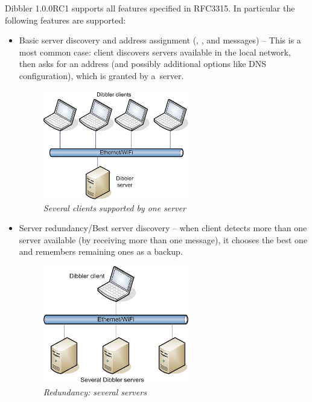 Dibbler 1.0.0RC1 supports all features specified in RFC3315. In
particular the following features are supported:
\begin{itemize}
\item Basic server discovery and address assignment (,
      ,  and  messages) -- This
      is a most common case: client discovers servers available in the
      local network, then asks for an address (and possibly additional
      options like DNS configuration), which is granted by a~server.

\begin{figure}[ht]
\begin{center}
\includegraphics[width=0.6\textwidth]{dibbler-multiple-cli}
\caption{\emph{Several clients supported by one server}}
\end{center}
\end{figure}

\item Server redundancy/Best server discovery -- when client detects
      more than one server available (by receiving more than one
       message), it chooses the best one and remembers
      remaining ones as a backup.

\begin{figure}[ht]
\begin{center}
\includegraphics[width=0.6\textwidth]{dibbler-multiple-srv}
\caption{\emph{Redundancy: several servers}}
\end{center}
\end{figure}


\end{itemize}
